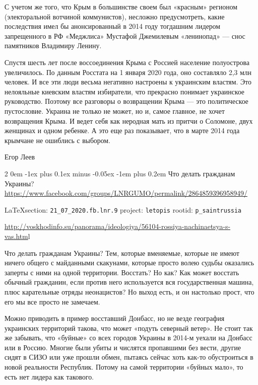 \documentclass[a4paper,11pt]{extreport}
\makeatletter
\renewcommand\subsection{%
  \clearpage
    \@startsection{subsection}%
    {2}%
    {0em}%
    {-1ex plus 0.1ex minus -0.05ex}%
    {-1em plus 0.2em}%
    {\scshape\bfseries\Large}%
}
\makeatother
\begin{document}
С учетом же того, что Крым в большинстве своем был «красным» регионом (электоральной вотчиной коммунистов), несложно предусмотреть, какие последствия имел бы анонсированный в 2014 году тогдашним лидером запрещенного в РФ «Меджлиса» Мустафой Джемилевым «ленинопад» --- снос памятников Владимиру Ленину.

Спустя шесть лет после воссоединения Крыма с Россией население полуострова увеличилось. По данным Росстата на 1 января 2020 года, оно составляло 2,3 млн человек. И все эти люди весьма негативно настроены к украинским властям. Это нелояльные киевским властям избиратели, что прекрасно понимает украинское руководство. Поэтому все разговоры о возвращении Крыма --- это политическое пустословие. Украина не только не может, но и, самое главное, не хочет возвращения Крыма. И ведет себя как неродная мать из притчи о Соломоне, двух женщинах и одном ребенке. А это еще раз показывает, что в марте 2014 года крымчане не ошиблись с выбором.

Егор Леев
  
 
 
\subsection{Что делать гражданам Украины?}
\label{sec:21_07_2020.fb.lnr.9}
\url{https://www.facebook.com/groups/LNRGUMO/permalink/2864859396958949/}
  
\vspace{0.5cm}
{\small\LaTeX section: \verb|21_07_2020.fb.lnr.9| project: \verb|letopis| rootid: \verb|p_saintrussia|}
\vspace{0.5cm}

\url{http://voskhodinfo.su/panorama/ideologiya/56104-rossiya-nachinaetsya-s-vas.htm}l

Что делать гражданам Украины? Тем, которые вменяемые, которые не имеют ничего
общего с майданными скакунами, которые просто волею судьбы оказались заперты с
ними на одной территории. Восстать? Но как? Как может восстать обычный
гражданин, если против него используется вся государственная машина, плюс
карательные отряды неонацистов? Но выход есть, и он настолько прост, что его мы
все просто не замечаем.

Можно приводить в пример восставший Донбасс, но не везде география украинских
территорий такова, что может «подуть северный ветер». Не стоит так же забывать,
что «буйные» со всех городов Украины в 2014-м уехали на Донбасс или в Россию.
Многие были убиты и числятся пропавшими без вести, другие сидят в СИЗО или уже
прошли обмен, пытаясь сейчас хоть как-то обустроиться в новой реальности
Республик. Потому на самой территории «буйных мало», то есть нет лидера как
такового.
\end{document}
